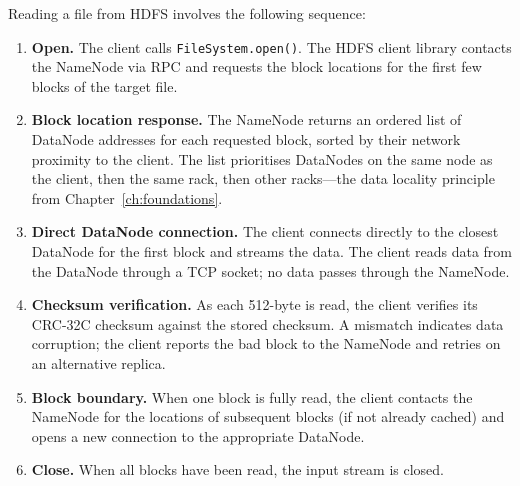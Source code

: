 Reading a file from HDFS involves the following sequence:

\begin{enumerate}
  \item \textbf{Open.} The client calls \texttt{FileSystem.open()}.
        The HDFS client library contacts the NameNode via RPC and
        requests the block locations for the first few blocks of the
        target file.

  \item \textbf{Block location response.} The NameNode returns an
        ordered list of DataNode addresses for each requested block,
        sorted by their network proximity to the client. The list
        prioritises DataNodes on the same node as the client, then
        the same rack, then other racks---the data locality principle
        from Chapter~\ref{ch:foundations}.

  \item \textbf{Direct DataNode connection.} The client connects
        directly to the closest DataNode for the first block and
        streams the data. The client reads data from the DataNode
        through a TCP socket; no data passes through the NameNode.

  \item \textbf{Checksum verification.} As each 512-byte
         is read, the client verifies its CRC-32C
        checksum against the stored checksum. A mismatch indicates
        data corruption; the client reports the bad block to the
        NameNode and retries on an alternative replica.

  \item \textbf{Block boundary.} When one block is fully read, the
        client contacts the NameNode for the locations of subsequent
        blocks (if not already cached) and opens a new connection to
        the appropriate DataNode.

  \item \textbf{Close.} When all blocks have been read, the input
        stream is closed.
\end{enumerate}

